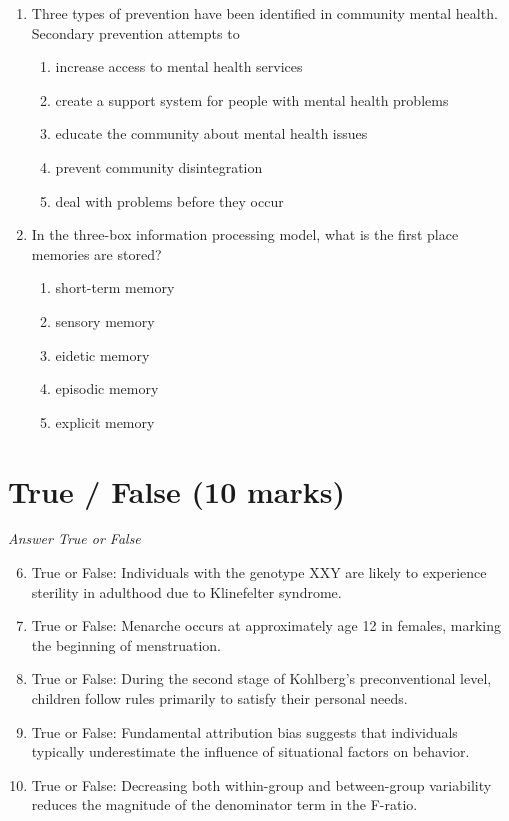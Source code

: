 \documentclass[12pt]{article}
\begin{document}
\begin{enumerate}[label=\arabic*.]
\begin{enumerate}[label=(\alph*)]
\end{enumerate}
\item Three types of prevention have been identified in community mental health. Secondary prevention attempts to
\begin{enumerate}[label=(\alph*)]
    \item increase access to mental health services
    \item create a support system for people with mental health problems
    \item educate the community about mental health issues
    \item prevent community disintegration
    \item deal with problems before they occur
\end{enumerate}
\item In the three-box information processing model, what is the first place memories are stored?
\begin{enumerate}[label=(\alph*)]
    \item short-term memory
    \item sensory memory
    \item eidetic memory
    \item episodic memory
    \item explicit memory
\end{enumerate}
\end{enumerate}

\section*{True / False (10 marks)}
\textit{Answer True or False}
\begin{enumerate}[label=\arabic*.]
\setcounter{enumi}{5}
\item True or False: Individuals with the genotype XXY are likely to experience sterility in adulthood due to Klinefelter syndrome.
\item True or False: Menarche occurs at approximately age 12 in females, marking the beginning of menstruation.
\item True or False: During the second stage of Kohlberg's preconventional level, children follow rules primarily to satisfy their personal needs.
\item True or False: Fundamental attribution bias suggests that individuals typically underestimate the influence of situational factors on behavior.
\item True or False: Decreasing both within-group and between-group variability reduces the magnitude of the denominator term in the F-ratio.
\end{enumerate}
\end{document}
